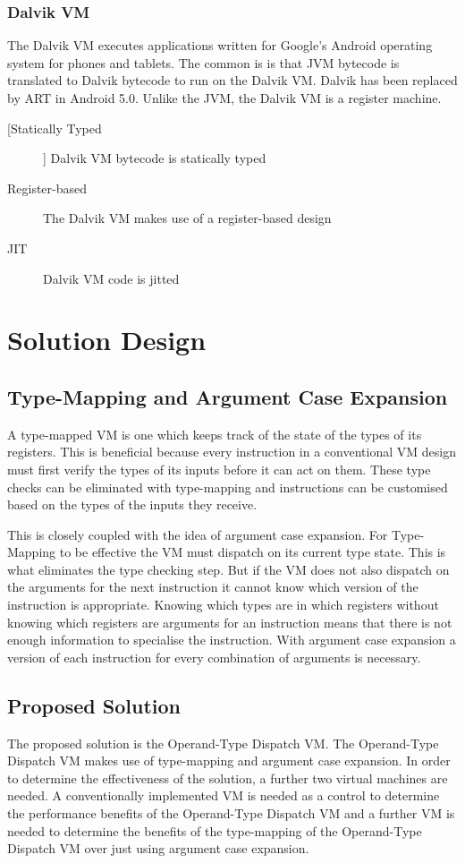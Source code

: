 \documentclass[english,a4paper]{report}
\begin{document}
\subsection{Dalvik VM}
The Dalvik VM executes applications written for Google's Android
operating system for phones and tablets. The common is is that JVM
bytecode is translated to Dalvik bytecode to run on the Dalvik
VM. Dalvik has been replaced by ART in Android 5.0. Unlike the JVM,
the Dalvik VM is a register machine.
\begin{description}
\item[[Statically Typed]] Dalvik VM bytecode is statically typed
\item[Register-based] The Dalvik VM makes use of a register-based
  design
\item[JIT] Dalvik VM code is jitted
\end{description}

\chapter{Solution Design}



\section{Type-Mapping and Argument Case Expansion}

A type-mapped VM is one which keeps track of the state of the types of
its registers. This is beneficial because every instruction in a
conventional VM design must first verify the types of its inputs
before it can act on them. These type checks can be eliminated with
type-mapping and instructions can be customised based on the types of
the inputs they receive. 

This is closely coupled with the idea of argument case expansion. For 
Type-Mapping to be effective the VM must dispatch on its current type 
state. This is what eliminates the type checking step. But if the VM 
does not also dispatch on the arguments for the next instruction it 
cannot know which version of the instruction is appropriate. Knowing 
which types are in which registers without knowing which registers 
are arguments for an instruction means that there is not enough 
information to specialise the instruction. With argument case 
expansion a version of each instruction for every combination of 
arguments is necessary.

\section{Proposed Solution}
The proposed solution is the Operand-Type Dispatch VM. The
Operand-Type Dispatch VM makes use of type-mapping and argument case
expansion. In order to determine the effectiveness of the solution, a
further two virtual machines are needed. A conventionally implemented
VM is needed as a control to determine the performance benefits of the
Operand-Type Dispatch VM and a further VM is needed to determine the
benefits of the type-mapping of the Operand-Type Dispatch VM over just
using argument case expansion. 
\end{document}
